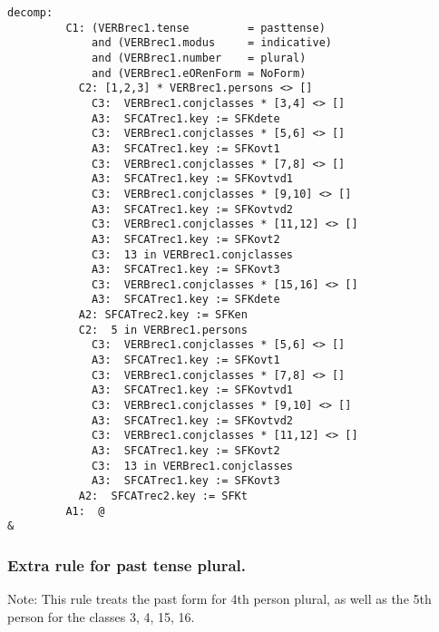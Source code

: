 \begin{verbatim}
decomp:
         C1: (VERBrec1.tense         = pasttense) 
             and (VERBrec1.modus     = indicative) 
             and (VERBrec1.number    = plural)     
             and (VERBrec1.eORenForm = NoForm)
           C2: [1,2,3] * VERBrec1.persons <> []
             C3:  VERBrec1.conjclasses * [3,4] <> []
             A3:  SFCATrec1.key := SFKdete
             C3:  VERBrec1.conjclasses * [5,6] <> []
             A3:  SFCATrec1.key := SFKovt1
             C3:  VERBrec1.conjclasses * [7,8] <> []
             A3:  SFCATrec1.key := SFKovtvd1
             C3:  VERBrec1.conjclasses * [9,10] <> []
             A3:  SFCATrec1.key := SFKovtvd2
             C3:  VERBrec1.conjclasses * [11,12] <> []
             A3:  SFCATrec1.key := SFKovt2
             C3:  13 in VERBrec1.conjclasses
             A3:  SFCATrec1.key := SFKovt3
             C3:  VERBrec1.conjclasses * [15,16] <> []
             A3:  SFCATrec1.key := SFKdete
           A2: SFCATrec2.key := SFKen
           C2:  5 in VERBrec1.persons 
             C3:  VERBrec1.conjclasses * [5,6] <> []
             A3:  SFCATrec1.key := SFKovt1
             C3:  VERBrec1.conjclasses * [7,8] <> []
             A3:  SFCATrec1.key := SFKovtvd1
             C3:  VERBrec1.conjclasses * [9,10] <> []
             A3:  SFCATrec1.key := SFKovtvd2
             C3:  VERBrec1.conjclasses * [11,12] <> []
             A3:  SFCATrec1.key := SFKovt2
             C3:  13 in VERBrec1.conjclasses
             A3:  SFCATrec1.key := SFKovt3
           A2:  SFCATrec2.key := SFKt
         A1:  @
&
\end{verbatim}
\newpage
\subsubsection{Extra rule for past tense plural.}

Note: This rule treats the past form for 4th person plural, as well as the
5th person for the classes  3, 4, 15, 16. 

